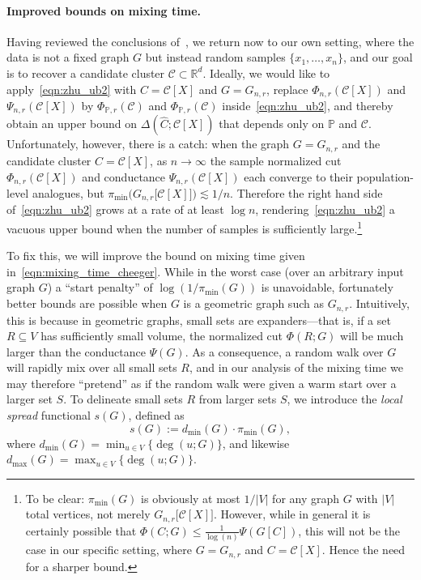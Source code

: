 \documentclass[11pt,twoside]{article}
\newcommand{\Reals}{\mathbb{R}}
\newcommand{\1}{\mathbf{1}}
\newcommand{\Rd}{\Reals^d}
\newcommand{\mc}[1]{\mathcal{#1}}
\newcommand{\Pbb}{\mathbb{P}}
\newcommand{\wh}[1]{\widehat{#1}}
\begin{document}
\paragraph{Improved bounds on mixing time.} Having reviewed the conclusions of~\cite{zhu2013}, we return now to our own setting, where the data is not a fixed graph $G$ but instead random samples $\{x_1,\ldots,x_n\}$, and our goal is to recover a candidate cluster $\mc{C} \subset \Rd$. Ideally, we would like to apply~\eqref{eqn:zhu_ub2} with $C = \mc{C}[X]$ and $G = G_{n,r}$, replace $\Phi_{n,r}(\mc{C}[X])$ and $\Psi_{n,r}(\mc{C}[X])$ by $\Phi_{\Pbb,r}(\mc{C})$ and $\Phi_{\Pbb,r}(\mc{C})$ inside~\eqref{eqn:zhu_ub2}, and thereby obtain an upper bound on $\Delta(\wh{C};\mc{C}[X])$ that depends only on $\Pbb$ and $\mc{C}$. Unfortunately, however, there is a catch: when the graph $G = G_{n,r}$ and the candidate cluster $C = \mc{C}[X]$, as $n \to \infty$ the sample normalized cut $\Phi_{n,r}(\mc{C}[X])$ and conductance $\Psi_{n,r}(\mc{C}[X])$ each converge to their population-level analogues, but $\pi_{\min}\bigl(G_{n,r}\bigl[\mc{C}[X]\bigr]\bigr) \lesssim 1/n$. Therefore the right hand side of~\eqref{eqn:zhu_ub2} grows at a rate of at least $\log n$, rendering~\eqref{eqn:zhu_ub2} a vacuous upper bound when the number of samples is sufficiently large.\footnote{To be clear: $\pi_{\min}(G)$ is obviously at most $1/|V|$ for any graph $G$ with $|V|$ total vertices, not merely $G_{n,r}\bigl[\mc{C}[X]\bigr]$. However, while in general it is certainly possible that $\Phi(C;G) \leq \frac{1}{\log(n)} \Psi(G[C])$, this will not be the case in our specific setting, where $G = G_{n,r}$ and $C = \mc{C}[X]$. Hence the need for a sharper bound.} 

To fix this, we will improve the bound on mixing time given in~\eqref{eqn:mixing_time_cheeger}. While in the worst case (over an arbitrary input graph $G$) a ``start penalty'' of $\log(1/\pi_{\min}(G))$ is unavoidable, fortunately better bounds are possible when $G$ is a geometric graph such as $G_{n,r}$. Intuitively, this is because in geometric graphs, small sets are expanders---that is, if a set $R \subseteq V$ has sufficiently small volume, the normalized cut $\Phi(R;G)$ will be much larger than the conductance $\Psi(G)$. As a consequence, a random walk over $G$ will rapidly mix over all small sets $R$, and in our analysis of the mixing time we may therefore ``pretend'' as if the random walk were given a warm start over a larger set $S$. To delineate small sets $R$ from larger sets $S$, we introduce the \emph{local spread} functional $s(G)$, defined as
\begin{equation*}
s(G) := d_{\min}(G) \cdot \pi_{\min}(G),
\end{equation*}
where $d_{\min}(G) = \min_{u \in V}\bigl\{\deg(u;G)\bigr\}$, and likewise $d_{\max}(G) = \max_{u \in V}\bigl\{\deg(u;G)\bigr\}$. 
\end{document}
